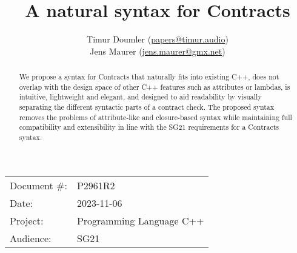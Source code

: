 



\usepackage{titlesec}
\usepackage{tocloft}


\newcommand{\changelocaltocdepth}[1]{%
  \addtocontents{toc}{\protect\setcounter{tocdepth}{#1}}%
  \setcounter{tocdepth}{#1}%
}

\setcounter{tocdepth}{3}



\title{A natural syntax for Contracts}
\author{ Timur Doumler \small(\href{mailto:papers@timur.audio}{papers@timur.audio})\\
Jens Maurer \small(\href{mailto:jens.maurer@gmx.net}{jens.maurer@gmx.net})}
\date{}
\maketitle

\begin{tabular}{ll}
Document \#: & P2961R2 \\
Date: &2023-11-06\\
Project: & Programming Language C++ \\
Audience: & SG21
\end{tabular}

\begin{abstract}
We propose a syntax for Contracts that naturally fits into existing C++, does not overlap with the design space of other C++ features such as attributes or lambdas, is intuitive, lightweight and elegant, and designed to aid readability by visually separating the different syntactic parts of a contract check. The proposed syntax removes the problems of attribute-like and closure-based syntax while maintaining full compatibility and extensibility in line with the SG21 requirements for a Contracts syntax.
\end{abstract}


\tableofcontents*


